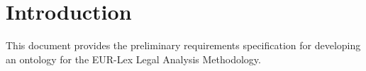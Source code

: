 \hypertarget{ariaid-title1}{%
\section{Introduction}\label{ariaid-title1}}

This document provides the preliminary requirements specification for
developing an ontology for the EUR-Lex Legal Analysis Methodology.
